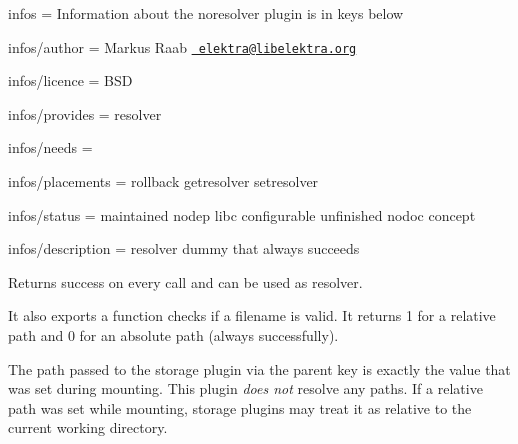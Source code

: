 
\begin{DoxyItemize}
\item infos = Information about the noresolver plugin is in keys below
\item infos/author = Markus Raab \href{mailto:elektra@libelektra.org}{\texttt{ elektra@libelektra.\+org}}
\item infos/licence = B\+SD
\item infos/provides = resolver
\item infos/needs =
\item infos/placements = rollback getresolver setresolver
\item infos/status = maintained nodep libc configurable unfinished nodoc concept
\item infos/description = resolver dummy that always succeeds
\end{DoxyItemize}

Returns success on every call and can be used as resolver.

It also exports a function checks if a filename is valid. It returns 1 for a relative path and 0 for an absolute path (always successfully).

The path passed to the storage plugin via the parent key is exactly the value that was set during mounting. This plugin {\itshape does not} resolve any paths. If a relative path was set while mounting, storage plugins may treat it as relative to the current working directory. 